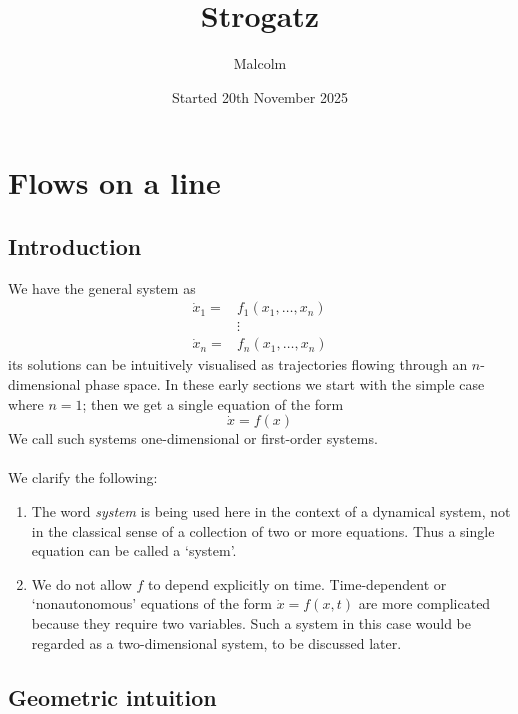 \documentclass{report}
\title{Strogatz}
\date{Started 20th November 2025}
\author{Malcolm}
\theoremstyle{definition}
\begin{document}
\maketitle

\tableofcontents

\chapter{Flows on a line}
\section{Introduction}
We have the general system as
\begin{align*}
\dot x_1=&f_1(x_1,\ldots,x_n)\\
&\vdots\\
\dot x_n=&f_n(x_1,\ldots,x_n)
\end{align*}
its solutions can be intuitively visualised as trajectories flowing through an $n$-dimensional phase space. In these early sections we start with the simple case where $n=1$; then we get a single
equation of the form
\begin{equation*}
\dot x=f(x)
\end{equation*}
We call such systems one-dimensional or first-order systems.\\
\vspace{1mm}\\
We clarify the following:
\begin{enumerate}
\item The word \textit{system} is being used here in the context of a dynamical system, not in the classical sense of a collection of two or more equations. Thus a single equation can be called a
`system'.
\item We do not allow $f$ to depend explicitly on time. Time-dependent or `nonautonomous' equations of the form $\dot x=f(x,t)$ are more complicated because they require two variables. Such a system
in this case would be regarded as a two-dimensional system, to be discussed later.
\end{enumerate}
\newpage

\section{Geometric intuition}
\end{document}
